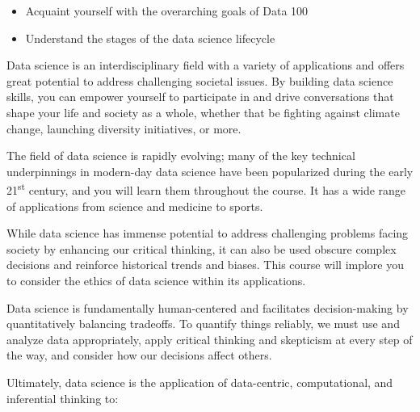 \documentclass[
  letterpaper,
  DIV=11,
  numbers=noendperiod]{scrreprt}
\providecommand{\tightlist}{%
  \setlength{\itemsep}{0pt}\setlength{\parskip}{0pt}}\usepackage{longtable,booktabs,array}
\begin{document}
\begin{tcolorbox}[enhanced jigsaw, titlerule=0mm, breakable, opacityback=0, leftrule=.75mm, opacitybacktitle=0.6, colback=white, colframe=quarto-callout-note-color-frame, colbacktitle=quarto-callout-note-color!10!white, left=2mm, rightrule=.15mm, arc=.35mm, toprule=.15mm, coltitle=black, bottomrule=.15mm, bottomtitle=1mm, toptitle=1mm, title=\textcolor{quarto-callout-note-color}{\faInfo}\hspace{0.5em}{Learning Outcomes}]

\begin{itemize}
\tightlist
\item
  Acquaint yourself with the overarching goals of Data 100
\item
  Understand the stages of the data science lifecycle
\end{itemize}

\end{tcolorbox}

Data science is an interdisciplinary field with a variety of
applications and offers great potential to address challenging societal
issues. By building data science skills, you can empower yourself to
participate in and drive conversations that shape your life and society
as a whole, whether that be fighting against climate change, launching
diversity initiatives, or more.

The field of data science is rapidly evolving; many of the key technical
underpinnings in modern-day data science have been popularized during
the early 21\textsuperscript{st} century, and you will learn them
throughout the course. It has a wide range of applications from science
and medicine to sports.

While data science has immense potential to address challenging problems
facing society by enhancing our critical thinking, it can also be used
obscure complex decisions and reinforce historical trends and biases.
This course will implore you to consider the ethics of data science
within its applications.

Data science is fundamentally human-centered and facilitates
decision-making by quantitatively balancing tradeoffs. To quantify
things reliably, we must use and analyze data appropriately, apply
critical thinking and skepticism at every step of the way, and consider
how our decisions affect others.

Ultimately, data science is the application of data-centric,
computational, and inferential thinking to:
\end{document}
